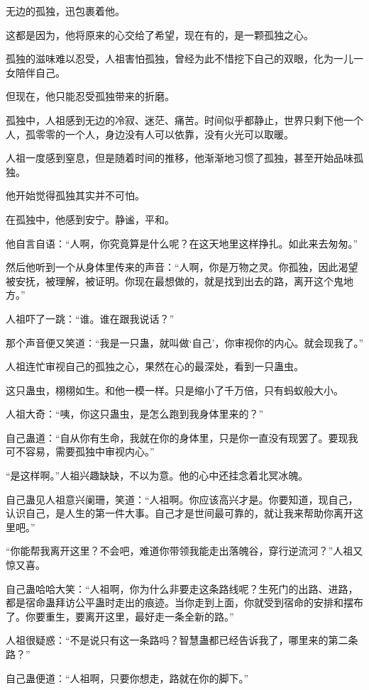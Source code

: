 \begin{this_body}
无边的孤独，迅包裹着他。

这都是因为，他将原来的心交给了希望，现在有的，是一颗孤独之心。

孤独的滋味难以忍受，人祖害怕孤独，曾经为此不惜挖下自己的双眼，化为一儿一女陪伴自己。

但现在，他只能忍受孤独带来的折磨。

孤独中，人祖感到无边的冷寂、迷茫、痛苦。时间似乎都静止，世界只剩下他一个人，孤零零的一个人，身边没有人可以依靠，没有火光可以取暖。

人祖一度感到窒息，但是随着时间的推移，他渐渐地习惯了孤独，甚至开始品味孤独。

他开始觉得孤独其实并不可怕。

在孤独中，他感到安宁。静谧，平和。

他自言自语：“人啊，你究竟算是什么呢？在这天地里这样挣扎。如此来去匆匆。”

然后他听到一个从身体里传来的声音：“人啊，你是万物之灵。你孤独，因此渴望被安抚，被理解，被证明。你现在最想做的，就是找到出去的路，离开这个鬼地方。”

人祖吓了一跳：“谁。谁在跟我说话？”

那个声音便又笑道：“我是一只蛊，就叫做‘自己’，你审视你的内心。就会现我了。”

人祖连忙审视自己的孤独之心，果然在心的最深处，看到一只蛊虫。

这只蛊虫，栩栩如生。和他一模一样。只是缩小了千万倍，只有蚂蚁般大小。

人祖大奇：“咦，你这只蛊虫，是怎么跑到我身体里来的？”

自己蛊道：“自从你有生命，我就在你的身体里，只是你一直没有现罢了。要现我可不容易，需要孤独中审视内心。”

“是这样啊。”人祖兴趣缺缺，不以为意。他的心中还挂念着北冥冰魄。

自己蛊见人祖意兴阑珊，笑道：“人祖啊。你应该高兴才是。你要知道，现自己，认识自己，是人生的第一件大事。自己才是世间最可靠的，就让我来帮助你离开这里吧。”

“你能帮我离开这里？不会吧，难道你带领我能走出落魄谷，穿行逆流河？”人祖又惊又喜。

自己蛊哈哈大笑：“人祖啊，你为什么非要走这条路线呢？生死门的出路、进路，都是宿命蛊拜访公平蛊时走出的痕迹。当你走到上面，你就受到宿命的安排和摆布了。你要重生，要离开这里，最好走一条全新的路。”

人祖很疑惑：“不是说只有这一条路吗？智慧蛊都已经告诉我了，哪里来的第二条路？”

自己蛊便道：“人祖啊，只要你想走，路就在你的脚下。”


\end{this_body}
